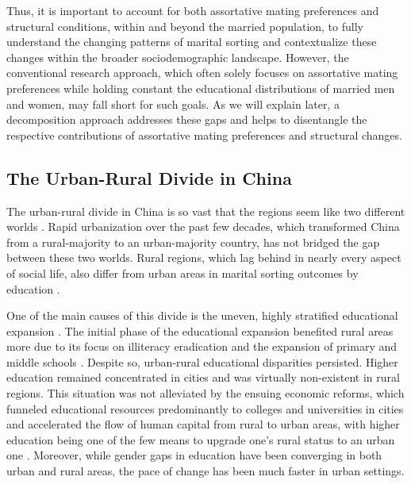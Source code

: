 Thus, it is important to account for both assortative mating preferences and structural conditions, within and beyond the married population, to fully understand the changing patterns of marital sorting and contextualize these changes within the broader sociodemographic landscape. However, the conventional research approach, which often solely focuses on assortative mating preferences while holding constant the educational distributions of married men and women, may fall short for such goals. As we will explain later, a decomposition approach addresses these gaps and helps to disentangle the respective contributions of assortative mating preferences and structural changes.

\subsection{The Urban-Rural Divide in China}

The urban-rural divide in China is so vast that the regions seem like two different worlds \parencite{rozelleInvisibleChinaHow2020,sicularUrbanRuralIncomeGap2007,treimanDifferenceHeavenEarth2012}. Rapid urbanization over the past few decades, which transformed China from a rural-majority to an urban-majority country, has not bridged the gap between these two worlds. Rural regions, which lag behind in nearly every aspect of social life, also differ from urban areas in marital sorting outcomes by education \parencite{duTrendsEducationalAssortative2023}.

One of the main causes of this divide is the uneven, highly stratified educational expansion \parencite{yeungHigherEducationExpansion2013}. The initial phase of the educational expansion benefited rural areas more due to its focus on illiteracy eradication and the expansion of primary and middle schools \parencite{hannumPoliticalChangeUrbanRural1999,sicularBigExpansionRural2022}. Despite so, urban-rural educational disparities persisted. Higher education remained concentrated in cities and was virtually non-existent in rural regions. This situation was not alleviated by the ensuing economic reforms, which funneled educational resources predominantly to colleges and universities in cities and accelerated the flow of human capital from rural to urban areas, with higher education being one of the few means to upgrade one's rural status to an urban one \parencite{duTrendsEducationalAssortative2023,yeungHigherEducationExpansion2013}. Moreover, while gender gaps in education have been converging in both urban and rural areas, the pace of change has been much faster in urban settings.

